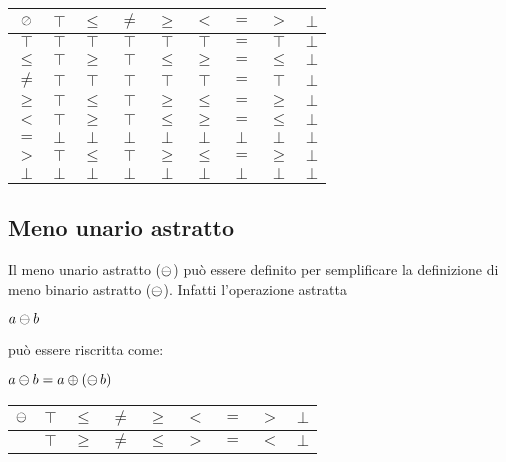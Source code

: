 \begin{center}
	\begin{tabular}{| c | c | c | c | c | c | c | c | c | }
		\hline
		$\mathbin{\oslash}$ & $\top$ & $\leq$ & $\neq$ & $\geq$ & $<$ & $=$ & $>$ & $\bot$ \\
		\hline
		$\top$ & $\top$ & $\top$ & $\top$ & $\top$ & $\top$ & $=$ & $\top$ & $\bot$\\
		\hline
		$\leq$ & $\top$ & $\geq$ & $\top$ & $\leq$ & $\geq$ & $=$ & $\leq$ & $\bot$\\
		\hline
		$\neq$ & $\top$ & $\top$ & $\top$ & $\top$ & $\top$ & $=$ & $\top$ & $\bot$\\
		\hline
		$\geq$ & $\top$ & $\leq$ & $\top$ & $\geq$ & $\leq$ & $=$ & $\geq$ & $\bot$\\
		\hline
		$<$ & $\top$ & $\geq$ & $\top$ & $\leq$ & $\geq$ & $=$ & $\leq$ & $\bot$\\
		\hline
		$=$ & $\bot$ & $\bot$ & $\bot$ & $\bot$ & $\bot$ & $\bot$ & $\bot$ & $\bot$\\
		\hline
		$>$ & $\top$ & $\leq$ & $\top$ & $\geq$ & $\leq$ & $=$ & $\geq$ & $\bot$\\
		\hline
		$\bot$ & $\bot$ & $\bot$ & $\bot$ & $\bot$ & $\bot$ & $\bot$ & $\bot$ & $\bot$\\
		\hline
	\end{tabular}
\end{center}

\subsection{Meno unario astratto}

Il meno unario astratto ($\mathop{\ominus}\nolimits$) può essere definito per semplificare la definizione di meno binario astratto ($\mathbin{\ominus}$). Infatti l'operazione astratta
\begin{center}
	$ a \mathbin{\ominus} b $
\end{center}
può essere riscritta come:

\begin{center}
	$ a  \mathbin{\ominus} b = a \mathbin{\oplus} (\mathop{\ominus}\nolimits b) $
\end{center}

\begin{center}
	\begin{tabular}{| c | c | c | c | c | c | c | c | c | }
		\hline
		$\mathop{\ominus}\nolimits$ & $\top$ & $\leq$ & $\neq$ & $\geq$ & $<$ & $=$ & $>$ & $\bot$ \\
		\hline
		  & $\top$ & $\geq$ & $\neq$ & $\leq$ & $>$ & $=$ & $<$ & $\bot$\\
		\hline
	\end{tabular}
\end{center}

